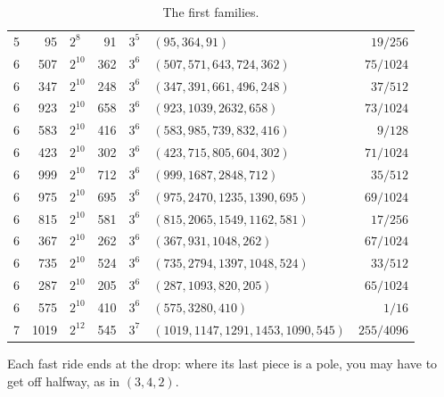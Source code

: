 \documentclass[10pt,a4paper,titlepage]{article}
\begin{document}
\begin{table}[htbp]
\begin{tabular}{@{}r r@{\,+\,$i\cdot$}l @{\,$\to$\,} r@{\,+\,$i\cdot$}l l r@{}}
5 &  95 & $2^8$    &  91 & $3^5$  & $(95, 364, 91)$             & $19/256$ \\
6 &  507 & $2^{10}$ &  362 & $3^6$  & $(507, 571, 643, 724, 362)$ & $75/1024$ \\
6 &  347 & $2^{10}$ &  248 & $3^6$  & $(347, 391, 661, 496, 248)$ & $37/512$ \\
6 &  923 & $2^{10}$ &  658 & $3^6$  & $(923, 1039, 2632, 658)$ & $73/1024$ \\
6 &  583 & $2^{10}$ &  416 & $3^6$  & $(583, 985, 739, 832, 416)$ & $9/128$ \\
6 &  423 & $2^{10}$ &  302 & $3^6$  & $(423, 715, 805, 604, 302)$ & $71/1024$ \\
6 &  999 & $2^{10}$ &  712 & $3^6$  & $(999, 1687, 2848, 712)$ & $35/512$ \\
6 &  975 & $2^{10}$ &  695 & $3^6$  & $(975, 2470, 1235, 1390, 695)$ & $69/1024$ \\
6 &  815 & $2^{10}$ &  581 & $3^6$  & $(815, 2065, 1549, 1162, 581)$ & $17/256$ \\
6 &  367 & $2^{10}$ &  262 & $3^6$  & $(367, 931, 1048, 262)$ & $67/1024$ \\
6 &  735 & $2^{10}$ &  524 & $3^6$  & $(735, 2794, 1397, 1048, 524)$ & $33/512$ \\
6 &  287 & $2^{10}$ &  205 & $3^6$  & $(287, 1093, 820, 205)$ & $65/1024$ \\
6 &  575 & $2^{10}$ &  410 & $3^6$  & $(575, 3280, 410)$ & $1/16$ \\
7 & 1019 & $2^{12}$ &  545 & $3^7$  & $(1019, 1147, 1291, 1453, 1090, 545)$ & $255/4096$ \\
\bottomrule
\end{tabular}
\caption{The first families.}
\label{tab:first}
\end{table}
Each fast ride ends at the drop: where its last piece is a pole, you may have to get
off halfway, as in $(3, 4, 2)$.
\end{document}

